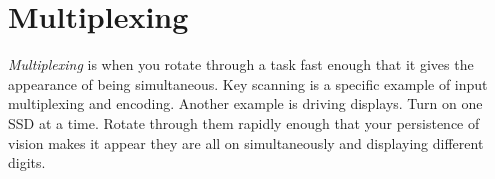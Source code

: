 \section{Multiplexing}

\emph{Multiplexing} is when you rotate through a task fast enough
that it gives the appearance of being simultaneous.
Key scanning is a specific example of input multiplexing and encoding.
Another example is driving displays. Turn on one SSD at a time.
Rotate through them rapidly enough that your persistence
of vision makes it appear they are all on simultaneously and displaying
different digits.